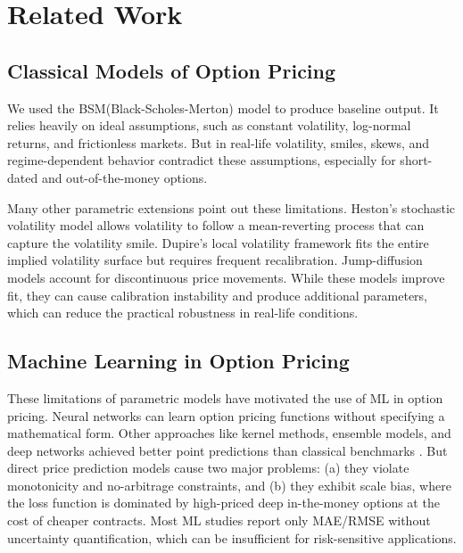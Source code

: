 \documentclass[runningheads]{llncs}
\newcommand{\rev}[1]{{\color{blue}#1}}
\begin{document}
\section{Related Work}

\subsection{Classical Models of Option Pricing}

We used the BSM(Black-Scholes-Merton) model \cite{black1973pricing,merton1973theory} to produce baseline output. It relies heavily on ideal assumptions, such as constant volatility, log-normal returns, and frictionless markets. But in real-life volatility, smiles, skews, and regime-dependent behavior contradict these assumptions, especially for short-dated and out-of-the-money options.

\rev{Many other parametric extensions point out these limitations. Heston's stochastic volatility model \cite{heston1993closed} allows volatility to follow a mean-reverting process that can capture the volatility smile. Dupire's local volatility framework \cite{dupire1994pricing} fits the entire implied volatility surface but requires frequent recalibration. Jump-diffusion models \cite{bates1996jumps} account for discontinuous price movements. While these models improve fit, they can cause calibration instability and produce additional parameters, which can reduce the practical robustness in real-life conditions.}

\subsection{Machine Learning in Option Pricing}

\rev{These limitations of parametric models have motivated the use of ML in option pricing.   Neural networks can learn option pricing functions without specifying a mathematical form\cite{hutchinson1994nonparametric}. Other approaches like kernel methods, ensemble models, and deep networks achieved better point predictions than classical benchmarks \cite{garcia2000pricing,gu2020empirical}. But direct price prediction models cause two major problems: (a) they violate monotonicity and no-arbitrage constraints, and (b) they exhibit scale bias, where the loss function is dominated by high-priced deep in-the-money options at the cost of cheaper contracts. Most ML studies report only MAE/RMSE without uncertainty quantification, which can be insufficient for risk-sensitive applications.}
\end{document}
